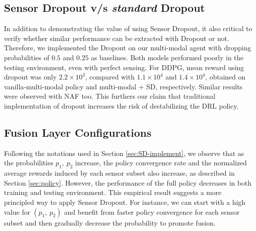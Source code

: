 \documentclass[../thesis.tex]{subfiles}
\begin{document}

\subsection{Sensor Dropout v/s \emph{standard} Dropout}


In addition to demonstrating the value of using Sensor Dropout, it also critical to verify whether similar performance can be extracted with Dropout or not. Therefore, we implemented the Dropout on our multi-modal agent with dropping probabilities of $0.5$ and $0.25$ as baselines. Both models performed poorly in the testing environment, even with perfect sensing. For DDPG, mean reward using dropout was only $2.2\times 10^3$, compared with $1.1\times 10^4$ and $1.4\times 10^4$, obtained on vanilla-multi-modal policy and multi-modal + SD, respectively. Similar results were observed with NAF too. This furthers our claim that traditional implementation of dropout increases the risk of destabilizing the DRL policy.

\subsection{Fusion Layer Configurations} \label{sec:SD-config}


Following the notations used in Section \ref{sec:SD-implement}, we observe that as the probabilities $p_1,~p_2$ increase, the policy convergence rate and the normalized average rewards induced by each sensor subset also increase, as described in Section \ref{sec:policy}. However, the performance of the full policy decreases in both training and testing environment. This empirical result suggests a more principled way to apply Sensor Dropout. For instance, we can start with a high value for $(p_1,~p_2)$ and benefit from faster policy convergence for each sensor subset and then gradually decrease the probability to promote fusion. 
\end{document}
